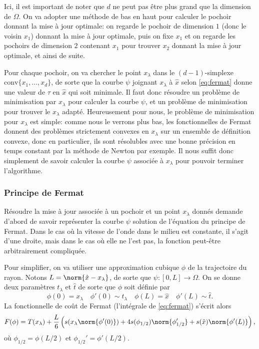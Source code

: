 \documentclass[math, info]{mpb-cours}
\begin{document}
\smallskip

Ici, il est important de noter que $d$ ne peut pas être plus grand que la dimension de $\Omega$.
On va adopter une méthode de bas en haut pour calculer le pochoir donnant la mise à jour optimale:
on regarde le pochoir de dimension $1$ (donc le voisin $x_{1}$) donnant la mise à jour optimale, puis on
fixe $x_{1}$ et on regarde les pochoirs de dimension $2$ contenant $x_{1}$ pour trouver $x_{2}$
donnant la mise à jour optimale, et ainsi de suite.

\smallskip

Pour chaque pochoir, on va chercher le point $x_{\lambda}$ dans le $(d - 1)$-simplexe
$\mathrm{conv} \{x_{1}, \ldots, x_{d}\}$, de sorte que la courbe $\psi$ joignant $x_{\lambda}$ à $\hat{x}$
selon \eqref{eq:fermat} donne une valeur de $\tau$ en $\hat{x}$ qui soit minimale.
Il faut donc résoudre un problème de minimisation par $x_{\lambda}$ pour calculer la courbe $\psi$, et un
problème de minimisation pour trouver le $x_{\lambda}$ adapté.
Heureusement pour nous, le problème de minimisation pour $x_{\lambda}$ est simple: comme nous le verrons
plus bas, les fonctionnelles de Fermat donnent des problèmes strictement convexes en $x_{\lambda}$ sur
un ensemble de définition convexe, donc en particulier, ils sont résolubles avec une bonne précision en
temps constant par la méthode de Newton par exemple.
Il nous suffit donc simplement de savoir calculer la courbe $\psi$ associée à $x_{\lambda}$ pour pouvoir
terminer l'algorithme.


\subsubsection{Principe de Fermat}
Résoudre la mise à jour associée à un pochoir et un point $x_{\lambda}$ donnés demande d'abord de savoir
représenter la courbe $\psi$ solution de l'équation du principe de Fermat.
Dans le cas où la vitesse de l'onde dans le milieu est constante, il s'agit d'une droite, mais
dans le cas où elle ne l'est pas, la fonction peut-être arbitrairement compliquée.

\smallskip

Pour simplifier, on va utiliser une approximation cubique $\phi$ de la trajectoire du rayon.
Notons $L = \norm{\hat{x} - x_{\lambda}}$, de sorte que $\psi: [0, L] \to \Omega$.
On se donne deux paramètres $t_{\lambda}$ et $\hat{t}$ de sorte que $\phi$ soit définie par
\begin{equation}
	\phi(0) = x_{\lambda} \quad \phi'(0) \sim t_{\lambda} \quad \phi(L) = \hat{x} \quad \phi'(L) \sim \hat{t}.
\end{equation}
La fonctionnelle de coût de Fermat (l'intégrale de \eqref{eq:fermat}) s'écrit alors
\begin{equation}
	F(\phi) = T(x_{\lambda}) + \frac{L}{6}\left(s(x_{\lambda}\norm{\phi'(0)}) + 4s(\phi_{1/2})\norm{\phi_{1/2}'} + s(\hat{x})\norm{\phi'(L)}\right),
\end{equation}
où $\phi_{1/2} = \phi(L/2)$ et $\phi_{1/2}' = \phi'(L/2)$.
\end{document}
